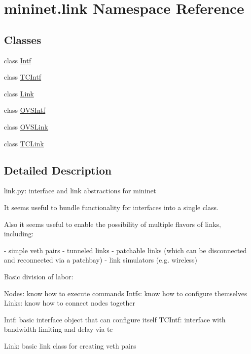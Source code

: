\hypertarget{namespacemininet_1_1link}{\section{mininet.\-link Namespace Reference}
\label{namespacemininet_1_1link}
}
\subsection*{Classes}
\begin{DoxyCompactItemize}
\item 
class \hyperlink{classmininet_1_1link_1_1Intf}{Intf}
\item 
class \hyperlink{classmininet_1_1link_1_1TCIntf}{T\-C\-Intf}
\item 
class \hyperlink{classmininet_1_1link_1_1Link}{Link}
\item 
class \hyperlink{classmininet_1_1link_1_1OVSIntf}{O\-V\-S\-Intf}
\item 
class \hyperlink{classmininet_1_1link_1_1OVSLink}{O\-V\-S\-Link}
\item 
class \hyperlink{classmininet_1_1link_1_1TCLink}{T\-C\-Link}
\end{DoxyCompactItemize}


\subsection{Detailed Description}
\begin{DoxyVerb}link.py: interface and link abstractions for mininet

It seems useful to bundle functionality for interfaces into a single
class.

Also it seems useful to enable the possibility of multiple flavors of
links, including:

- simple veth pairs
- tunneled links
- patchable links (which can be disconnected and reconnected via a patchbay)
- link simulators (e.g. wireless)

Basic division of labor:

  Nodes: know how to execute commands
  Intfs: know how to configure themselves
  Links: know how to connect nodes together

Intf: basic interface object that can configure itself
TCIntf: interface with bandwidth limiting and delay via tc

Link: basic link class for creating veth pairs
\end{DoxyVerb}
 